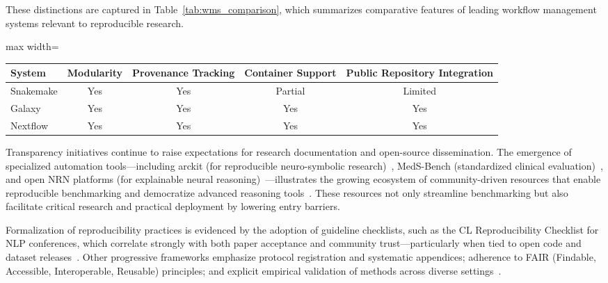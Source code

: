 \documentclass[sigconf]{acmart}
\begin{document}
These distinctions are captured in Table~\ref{tab:wms_comparison}, which summarizes comparative features of leading workflow management systems relevant to reproducible research.

\begin{table*}[htbp]
\centering
\caption{Comparative features of widely used workflow management systems supporting reproducible research.}
\label{tab:wms_comparison}
\begin{adjustbox}{max width=\textwidth}
\begin{tabular}{lcccc}
\toprule
\textbf{System} & \textbf{Modularity} & \textbf{Provenance Tracking} & \textbf{Container Support} & \textbf{Public Repository Integration} \\
\midrule
Snakemake & Yes & Yes & Partial & Limited \\
Galaxy    & Yes & Yes & Yes     & Yes    \\
Nextflow  & Yes & Yes & Yes     & Yes    \\
\bottomrule
\end{tabular}
\end{adjustbox}
\end{table*}

Transparency initiatives continue to raise expectations for research documentation and open-source dissemination. The emergence of specialized automation tools---including arckit (for reproducible neuro-symbolic research)~\cite{ref92}, MedS-Bench (standardized clinical evaluation)~\cite{ref95}, and open NRN platforms (for explainable neural reasoning)~\cite{ref93}---illustrates the growing ecosystem of community-driven resources that enable reproducible benchmarking and democratize advanced reasoning tools~\cite{ref65,ref66,ref67,ref71,ref81,ref82,ref87,ref101,ref102,ref104,ref105}. These resources not only streamline benchmarking but also facilitate critical research and practical deployment by lowering entry barriers.

Formalization of reproducibility practices is evidenced by the adoption of guideline checklists, such as the CL Reproducibility Checklist for NLP conferences, which correlate strongly with both paper acceptance and community trust---particularly when tied to open code and dataset releases~\cite{ref108}. Other progressive frameworks emphasize protocol registration and systematic appendices; adherence to FAIR (Findable, Accessible, Interoperable, Reusable) principles; and explicit empirical validation of methods across diverse settings~\cite{ref66,ref67,ref82}.
\end{document}
